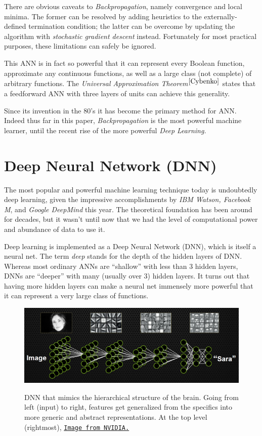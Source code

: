 \documentclass[12pt]{article}  %
\begin{document}
There are obvious caveats to {\em Backpropagation}, namely convergence and local minima. The former can be resolved by adding heuristics to the externally-defined termination condition; the latter can be overcome by updating the algorithm with {\em stochastic gradient descent} instead. Fortunately for most practical purposes, these limitations can safely be ignored.

This ANN is in fact so powerful that it can represent every Boolean function, approximate any continuous functions, as well as a large class (not complete) of arbitrary functions. The {\em Universal Approximation Theorem}$^{\ref{Cybenko}}$ states that a feedforward ANN with three layers of units can achieve this generality.

Since its invention in the 80's it has become the primary method for ANN. Indeed thus far in this paper, {\em Backpropagation} is the most powerful machine learner, until the recent rise of the more powerful {\em Deep Learning.}



\section{Deep Neural Network (DNN)}

The most popular and powerful machine learning technique today is undoubtedly deep learning, given the impressive accomplishments by \emph{IBM Watson, Facebook M}, and \emph{Google DeepMind} this year. The theoretical foundation has been around for decades, but it wasn't until now that we had the level of computational power and abundance of data to use it.

Deep learning is implemented as a Deep Neural Network (DNN), which is itself a neural net. The term \emph{deep} stands for the depth of the hidden layers of DNN. Whereas most ordinary ANNs are ``shallow'' with less than 3 hidden layers, DNNs are ``deeper'' with many (usually over 3) hidden layers. It turns out that having more hidden layers can make a neural net immensely more powerful that it can represent a very large class of functions.


\begin{figure}[ht]
\centering
\includegraphics[scale=0.9]{images/DNN.png}\\
\caption{DNN that mimics the hierarchical structure of the brain. Going from left (input) to right, features get generalized from the specifics into more generic and abstract representations. At the top level (rightmost),  \href{http://devblogs.nvidia.com/parallelforall/accelerate-machine-learning-cudnn-deep-neural-network-library/}{\tt Image from NVIDIA.}}\label{DNN-fig}
\end{figure}
\end{document}
